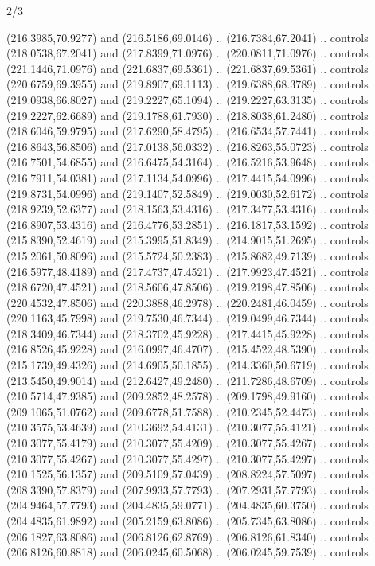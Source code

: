 \begin{flagdescription}{2/3}
\begin{scope}[xshift=0.5\flaglength,yshift=0.5\flagwidth,scale=\flagwidth/180]
\begin{scope}[y=0.8pt, x=0.8pt, yscale=-1,shift={(-168.75,-108.75)}]
  (216.3985,70.9277) and (216.5186,69.0146) .. (216.7384,67.2041) .. controls
  (218.0538,67.2041) and (217.8399,71.0976) .. (220.0811,71.0976) .. controls
  (221.1446,71.0976) and (221.6837,69.5361) .. (221.6837,69.5361) .. controls
  (220.6759,69.3955) and (219.8907,69.1113) .. (219.6388,68.3789) .. controls
  (219.0938,66.8027) and (219.2227,65.1094) .. (219.2227,63.3135) .. controls
  (219.2227,62.6689) and (219.1788,61.7930) .. (218.8038,61.2480) .. controls
  (218.6046,59.9795) and (217.6290,58.4795) .. (216.6534,57.7441) .. controls
  (216.8643,56.8506) and (217.0138,56.0332) .. (216.8263,55.0723) .. controls
  (216.7501,54.6855) and (216.6475,54.3164) .. (216.5216,53.9648) .. controls
  (216.7911,54.0381) and (217.1134,54.0996) .. (217.4415,54.0996) .. controls
  (219.8731,54.0996) and (219.1407,52.5849) .. (219.0030,52.6172) .. controls
  (218.9239,52.6377) and (218.1563,53.4316) .. (217.3477,53.4316) .. controls
  (216.8907,53.4316) and (216.4776,53.2851) .. (216.1817,53.1592) .. controls
  (215.8390,52.4619) and (215.3995,51.8349) .. (214.9015,51.2695) .. controls
  (215.2061,50.8096) and (215.5724,50.2383) .. (215.8682,49.7139) .. controls
  (216.5977,48.4189) and (217.4737,47.4521) .. (217.9923,47.4521) .. controls
  (218.6720,47.4521) and (218.5606,47.8506) .. (219.2198,47.8506) .. controls
  (220.4532,47.8506) and (220.3888,46.2978) .. (220.2481,46.0459) .. controls
  (220.1163,45.7998) and (219.7530,46.7344) .. (219.0499,46.7344) .. controls
  (218.3409,46.7344) and (218.3702,45.9228) .. (217.4415,45.9228) .. controls
  (216.8526,45.9228) and (216.0997,46.4707) .. (215.4522,48.5390) .. controls
  (215.1739,49.4326) and (214.6905,50.1855) .. (214.3360,50.6719) .. controls
  (213.5450,49.9014) and (212.6427,49.2480) .. (211.7286,48.6709) .. controls
  (210.5714,47.9385) and (209.2852,48.2578) .. (209.1798,49.9160) .. controls
  (209.1065,51.0762) and (209.6778,51.7588) .. (210.2345,52.4473) .. controls
  (210.3575,53.4639) and (210.3692,54.4131) .. (210.3077,55.4121) .. controls
  (210.3077,55.4179) and (210.3077,55.4209) .. (210.3077,55.4267) .. controls
  (210.3077,55.4267) and (210.3077,55.4297) .. (210.3077,55.4297) .. controls
  (210.1525,56.1357) and (209.5109,57.0439) .. (208.8224,57.5097) .. controls
  (208.3390,57.8379) and (207.9933,57.7793) .. (207.2931,57.7793) .. controls
  (204.9464,57.7793) and (204.4835,59.0771) .. (204.4835,60.3750) .. controls
  (204.4835,61.9892) and (205.2159,63.8086) .. (205.7345,63.8086) .. controls
  (206.1827,63.8086) and (206.8126,62.8769) .. (206.8126,61.8340) .. controls
  (206.8126,60.8818) and (206.0245,60.5068) .. (206.0245,59.7539) .. controls

\end{scope}
\end{scope}
\end{flagdescription}
